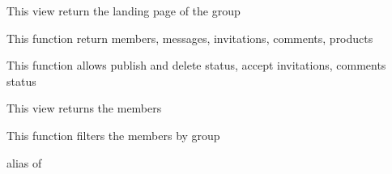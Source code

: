 \documentclass[letterpaper,10pt,english]{sphinxmanual}
\begin{document}
\begin{fulllineitems}
\label{modules/groups:apps.groups.views.MyGroupView}
This view return the landing page of the group

\begin{fulllineitems}
\label{modules/groups:apps.groups.views.MyGroupView.get_context_data}
This function return members, messages, invitations, comments, products

\end{fulllineitems}


\begin{fulllineitems}
\label{modules/groups:apps.groups.views.MyGroupView.post}
This function allows publish and delete status, accept invitations, comments status

\end{fulllineitems}


\end{fulllineitems}


\begin{fulllineitems}
\label{modules/groups:apps.groups.views.MyGroupsList}
This view returns the members

\begin{fulllineitems}
\label{modules/groups:apps.groups.views.MyGroupsList.get_queryset}
This function filters the members by group

\end{fulllineitems}


\begin{fulllineitems}
\label{modules/groups:apps.groups.views.MyGroupsList.model}
alias of 

\end{fulllineitems}


\end{fulllineitems}
\end{document}
